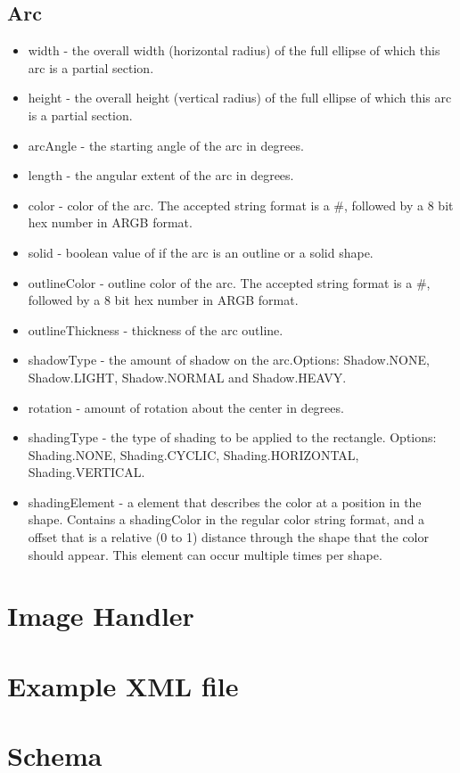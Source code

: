 \documentclass{article}
\begin{document}
\subsection{Arc}
\begin{itemize}
\item width - the overall width (horizontal radius) of the full ellipse of which this arc is a partial section. 
\item height - the overall height (vertical radius) of the full ellipse of which this arc is a partial section.
\item arcAngle - the starting angle of the arc in degrees.
\item length - the angular extent of the arc in degrees.
\item color - color of the arc. The accepted string format is a \#, followed by a 8 bit hex number in ARGB format.
\item solid - boolean value of if the arc is an outline or a solid shape.
\item outlineColor - outline color of the arc. The accepted string format is a \#, followed by a 8 bit hex number in ARGB format.
\item outlineThickness - thickness of the arc outline.
\item shadowType - the amount of shadow on the arc.\newline  Options: Shadow.NONE, Shadow.LIGHT, Shadow.NORMAL and Shadow.HEAVY.
\item rotation - amount of rotation about the center in degrees. 
\item shadingType - the type of shading to be applied to the rectangle. Options: Shading.NONE, Shading.CYCLIC, Shading.HORIZONTAL, Shading.VERTICAL.
\item shadingElement - a element that describes the color at a position in the shape. Contains a shadingColor in the regular color string format, and a offset that is a relative (0 to 1) distance through the shape that the color should appear. This element can occur multiple times per shape.
\end{itemize}


\section{Image Handler}
\clearpage


\section{Example XML file}
\small
\lstset{language=XML}


\clearpage

\section{Schema}
\lstset{language=XML}

\end{document}
